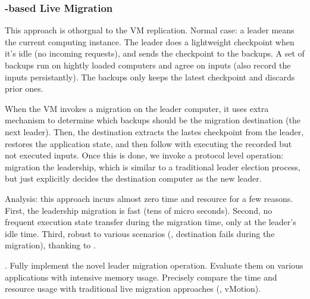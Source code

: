 \vspace{-.15in}\subsubsection{\paxos-based Live Migration} 
\label{sec:defense-arch}\vspace{-.075in}



This approach is othorgnal to the VM replication. Normal case: a leader means 
the current computing instance. The leader does a lightweight checkpoint when 
it's idle (no incoming requests), and sends the checkpoint to the backups. A 
set of backups run on hightly loaded computers and agree on inputs (also record 
the inputs persistantly). The backups only keeps the latest checkpoint and 
discards prior ones.

When the VM invokes a migration on the leader computer, it uses extra mechanism 
to determine which backups should be the migration destination (the next 
leader). Then, the destination extracts the lastes checkpoint from the leader, 
restores the application state, and then follow with executing the recorded but 
not executed inputs. Once this is done, we invoke a \falcon protocol 
level operation: migration the leadership, which is similar to a traditional 
\paxos leader election process, but just explicitly decides the destination 
computer as the new leader.

Analysis: this approach incurs almost zero time and resource for a few reasons. 
First, the leadership migration is fast (tens of micro seconds). Second, no 
frequent execution state transfer during the migration time, only at the 
leader's idle time. Third, robust to various scenarios (\eg, destination fails 
during the migration), thanking to \paxos.

. Fully implement the novel leader migration operation. 
Evaluate them on various applications with intensive memory usage. Precisely 
compare the time and resource usage with traditional live migration approaches 
(\eg, vMotion).


% 

